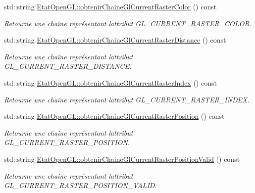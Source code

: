 \begin{DoxyCompactItemize}
std\+::string \hyperlink{group__utilitaire_ga62ef22c97a3ecc8c7e956f2fd7267b9d}{Etat\+Open\+G\+L\+::obtenir\+Chaine\+Gl\+Current\+Raster\+Color} () const 
\begin{DoxyCompactList}\small\item\em Retourne une chaîne représentant l\textquotesingle{}attribut G\+L\+\_\+\+C\+U\+R\+R\+E\+N\+T\+\_\+\+R\+A\+S\+T\+E\+R\+\_\+\+C\+O\+L\+O\+R. \end{DoxyCompactList}\item 
std\+::string \hyperlink{group__utilitaire_ga130c72bf45a65d7d7770c77c7f71cf5c}{Etat\+Open\+G\+L\+::obtenir\+Chaine\+Gl\+Current\+Raster\+Distance} () const 
\begin{DoxyCompactList}\small\item\em Retourne une chaîne représentant l\textquotesingle{}attribut G\+L\+\_\+\+C\+U\+R\+R\+E\+N\+T\+\_\+\+R\+A\+S\+T\+E\+R\+\_\+\+D\+I\+S\+T\+A\+N\+C\+E. \end{DoxyCompactList}\item 
std\+::string \hyperlink{group__utilitaire_ga9d14728a6f086186ff9ec92738952892}{Etat\+Open\+G\+L\+::obtenir\+Chaine\+Gl\+Current\+Raster\+Index} () const 
\begin{DoxyCompactList}\small\item\em Retourne une chaîne représentant l\textquotesingle{}attribut G\+L\+\_\+\+C\+U\+R\+R\+E\+N\+T\+\_\+\+R\+A\+S\+T\+E\+R\+\_\+\+I\+N\+D\+E\+X. \end{DoxyCompactList}\item 
std\+::string \hyperlink{group__utilitaire_ga1151f4eee3a50e14e0157b18b6fefaa4}{Etat\+Open\+G\+L\+::obtenir\+Chaine\+Gl\+Current\+Raster\+Position} () const 
\begin{DoxyCompactList}\small\item\em Retourne une chaîne représentant l\textquotesingle{}attribut G\+L\+\_\+\+C\+U\+R\+R\+E\+N\+T\+\_\+\+R\+A\+S\+T\+E\+R\+\_\+\+P\+O\+S\+I\+T\+I\+O\+N. \end{DoxyCompactList}\item 
std\+::string \hyperlink{group__utilitaire_gaa95c762062531085430d3bd8381c1ab1}{Etat\+Open\+G\+L\+::obtenir\+Chaine\+Gl\+Current\+Raster\+Position\+Valid} () const 
\begin{DoxyCompactList}\small\item\em Retourne une chaîne représentant l\textquotesingle{}attribut G\+L\+\_\+\+C\+U\+R\+R\+E\+N\+T\+\_\+\+R\+A\+S\+T\+E\+R\+\_\+\+P\+O\+S\+I\+T\+I\+O\+N\+\_\+\+V\+A\+L\+I\+D. \end{DoxyCompactList}\item 

\end{DoxyCompactItemize}
